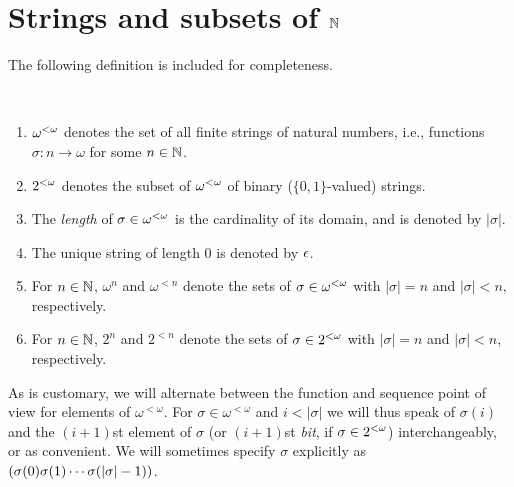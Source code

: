 \section{Strings and subsets of $\mathbb{N}$}\label{sec:bkg_strings}

The following definition is included for completeness.

\begin{definition}
\
	\begin{enumerate}
		\item $\baire$\index{$\baire$} denotes the set of all finite strings of natural numbers, i.e., functions $\sigma: n \to \omega$ for some $n \in \mathbb{N}$.
		\item $\cantor$\index{$\cantor$} denotes the subset of $\baire$ of binary ($\{0,1\}$-valued) strings.
		\item The \emph{length} of $\sigma \in {\omega^{<\omega}}$ is the cardinality of its domain, and is denoted by $|\sigma|$\index{$\lgth{\sigma}$}\index{$\lgth{\sigma}$}.
		\item The unique string of length $0$ is denoted by $\emptystr$\index{$\emptystr$}.
		\item For $n \in \mathbb{N}$, $\omega^n$\index{$\omega^n$} and $\omega^{<n}$ denote the sets of $\sigma \in {\omega^{<\omega}}$ with $|\sigma| = n$ and $|\sigma| < n$, respectively.
		\item For $n \in \mathbb{N}$, $2^n$\index{$2^n$} and $2^{<n}$\index{$2^{<n}$} denote the sets of $\sigma \in {2^{<\omega}}$ with $|\sigma| = n$ and $|\sigma| < n$, respectively.
	\end{enumerate}
\end{definition}

As is customary, we will alternate between the function and sequence point of view for elements of $\omega^{<\omega}$. For $\sigma \in \omega^{<\omega}$ and $i < |\sigma|$ we will thus speak of $\sigma(i)$ and the $(i+1)$st element of $\sigma$ (or $(i+1)$st \emph{bit}, if $\sigma \in {2^{<\omega}}$) interchangeably, or as convenient. We will sometimes specify $\sigma$ explicitly as $( \sigma(0)\sigma(1)\cdots \sigma(|\sigma|-1) )$.

